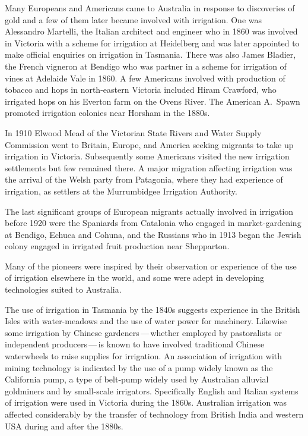 Many Europeans and Americans came to Australia in response to
discoveries of gold and a few of them later became involved with
irrigation.  One was Alessandro Martelli,  the
Italian architect and engineer who in 1860 was involved in Victoria
with a scheme for irrigation at Heidelberg and was later appointed to
make official enquiries on irrigation in Tasmania.  There was also
James Bladier,  the French vigneron at Bendigo who
was partner in a scheme for irrigation of vines at Adelaide Vale in
1860.  A few Americans involved with production of tobacco and hops in
north-eastern Victoria included Hiram Crawford, 
who irrigated hops on his Everton farm on the Ovens River.
 The American A.~Spawn  promoted
irrigation colonies near Horsham  in the 1880s.

In 1910 Elwood Mead of the Victorian State Rivers and Water Supply
Commission went to Britain, Europe, and America seeking migrants to
take up irrigation in Victoria.  Subsequently some Americans visited
the new irrigation settlements but few remained there.  A major
migration affecting irrigation was the arrival of the Welsh party from
Patagonia, where they had experience of irrigation, as settlers at the
Murrumbidgee Irrigation Authority.

The last significant groups of European migrants actually involved in
irrigation before 1920 were the Spaniards  from
Catalonia who engaged in market-gardening at Bendigo, Echuca and
Cohuna, and the Russians  who in 1913 began the Jewish
colony engaged in irrigated fruit production near Shepparton.

\bigskip\noindent
Many of the pioneers were inspired by their observation or experience
of the use of irrigation elsewhere in the world, and some were adept
in developing technologies suited to Australia.

The use of irrigation in Tasmania by the 1840s suggests experience in
the British Isles with water-meadows and the use of water power for
machinery.  Likewise some irrigation by Chinese
gardeners\,---\,whether employed by pastoralists or independent
producers\,---\,is known to have involved traditional Chinese
waterwheels to raise supplies for irrigation.  An association of
irrigation with mining technology is indicated by the use of a pump
widely known as the California pump,  a type
of belt-pump  widely used by Australian alluvial
goldminers and by small-scale irrigators.  Specifically English and
Italian systems of irrigation were used in Victoria during the
1860s. Australian irrigation was affected considerably by the transfer
of technology from British India and western USA during and after the
1880s.

